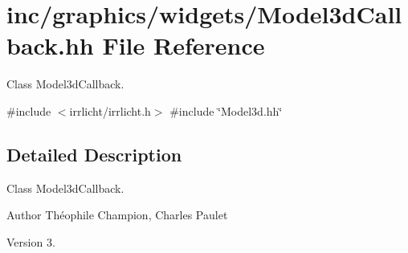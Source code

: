\hypertarget{inc_2graphics_2widgets_2Model3dCallback_8hh}{}\section{inc/graphics/widgets/\+Model3d\+Callback.hh File Reference}
\label{inc_2graphics_2widgets_2Model3dCallback_8hh}


Class Model3d\+Callback.  


{\ttfamily \#include $<$irrlicht/irrlicht.\+h$>$}\newline
{\ttfamily \#include \char`\"{}Model3d.\+hh\char`\"{}}\newline


\subsection{Detailed Description}
Class Model3d\+Callback. 

\begin{DoxyAuthor}{Author}
Théophile Champion, Charles Paulet 
\end{DoxyAuthor}
\begin{DoxyVersion}{Version}
3. 
\end{DoxyVersion}
